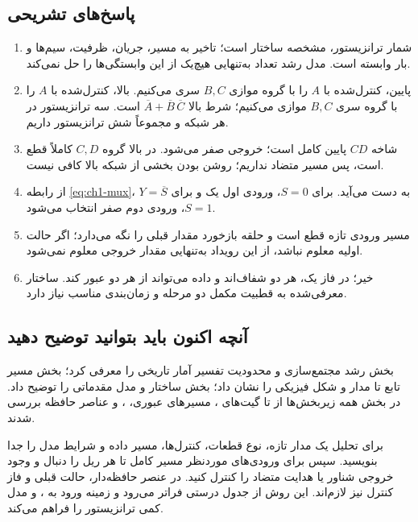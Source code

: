 \subsection{پاسخ‌های تشریحی}
\begin{enumerate}
\item شمار ترانزیستور، مشخصه ساختار است؛ تاخیر به مسیر، جریان، ظرفیت، سیم‌ها و بار وابسته است.
مدل رشد تعداد به‌تنهایی هیچ‌یک از این وابستگی‌ها را حل نمی‌کند.
\item پایین،  کنترل‌شده با \(A\) را با گروه موازی \(B,C\) سری می‌کنیم.
بالا،  کنترل‌شده با \(A\) را با گروه سری \(B,C\) موازی می‌کنیم؛
شرط بالا \(\overline{A}+\overline{B}\,\overline{C}\) است.
سه ترانزیستور در هر شبکه و مجموعاً شش ترانزیستور داریم.
\item شاخه \(CD\) پایین کامل است؛ خروجی صفر می‌شود.
در بالا گروه \(C,D\) کاملاً قطع است، پس مسیر متضاد نداریم؛ روشن بودن بخشی از شبکه بالا کافی نیست.
\item از رابطه \eqref{eq:ch1-mux}، \(Y=\overline{S}\) به دست می‌آید.
برای \(S=0\)، ورودی اول یک و برای \(S=1\)، ورودی دوم صفر انتخاب می‌شود.
\item مسیر ورودی تازه قطع است و حلقه بازخورد مقدار قبلی را نگه می‌دارد؛
اگر حالت اولیه معلوم نباشد، از این رویداد به‌تنهایی مقدار خروجی معلوم نمی‌شود.
\item خیر؛ در فاز یک، هر دو شفاف‌اند و داده می‌تواند از هر دو عبور کند.
ساختار معرفی‌شده به قطبیت مکمل دو مرحله و زمان‌بندی مناسب نیاز دارد.
\end{enumerate}

\subsection{آنچه اکنون باید بتوانید توضیح دهید}
بخش  رشد مجتمع‌سازی و محدودیت تفسیر آمار تاریخی را معرفی کرد؛
بخش  مسیر تابع تا مدار و شکل فیزیکی را نشان داد؛
بخش  ساختار و مدل مقدماتی  را توضیح داد.
در بخش  همه زیربخش‌ها از  تا گیت‌های
، مسیرهای عبوری، ،  و عناصر حافظه بررسی شدند.

برای تحلیل یک مدار تازه، نوع قطعات، کنترل‌ها، مسیر داده و شرایط مدل را جدا بنویسید.
سپس برای ورودی‌های موردنظر مسیر کامل تا هر ریل را دنبال و وجود خروجی شناور یا
هدایت متضاد را کنترل کنید. در عنصر حافظه‌دار، حالت قبلی و فاز کنترل نیز لازم‌اند.
این روش از جدول درستی فراتر می‌رود و زمینه ورود به ، 
و مدل کمی ترانزیستور را فراهم می‌کند.
